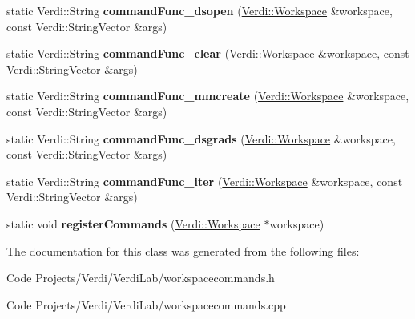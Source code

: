 \begin{DoxyCompactItemize}
\item 
\hypertarget{class_workspace_commands_a1a93570b748e9f36a4cf906cdf3c1391}{static \-Verdi\-::\-String {\bfseries command\-Func\-\_\-dsopen} (\hyperlink{class_verdi_1_1_workspace}{\-Verdi\-::\-Workspace} \&workspace, const \-Verdi\-::\-String\-Vector \&args)}\label{class_workspace_commands_a1a93570b748e9f36a4cf906cdf3c1391}

\item 
\hypertarget{class_workspace_commands_a8002b4885deb74c77c5c588121a77990}{static \-Verdi\-::\-String {\bfseries command\-Func\-\_\-clear} (\hyperlink{class_verdi_1_1_workspace}{\-Verdi\-::\-Workspace} \&workspace, const \-Verdi\-::\-String\-Vector \&args)}\label{class_workspace_commands_a8002b4885deb74c77c5c588121a77990}

\item 
\hypertarget{class_workspace_commands_a567dd0a62c2c9a026ed2b07e68b0336b}{static \-Verdi\-::\-String {\bfseries command\-Func\-\_\-mmcreate} (\hyperlink{class_verdi_1_1_workspace}{\-Verdi\-::\-Workspace} \&workspace, const \-Verdi\-::\-String\-Vector \&args)}\label{class_workspace_commands_a567dd0a62c2c9a026ed2b07e68b0336b}

\item 
\hypertarget{class_workspace_commands_ac7d9c4395b9c04cba9ce8e05bbc612c2}{static \-Verdi\-::\-String {\bfseries command\-Func\-\_\-dsgrads} (\hyperlink{class_verdi_1_1_workspace}{\-Verdi\-::\-Workspace} \&workspace, const \-Verdi\-::\-String\-Vector \&args)}\label{class_workspace_commands_ac7d9c4395b9c04cba9ce8e05bbc612c2}

\item 
\hypertarget{class_workspace_commands_a00687b362e9c2e422e568630a1c135f5}{static \-Verdi\-::\-String {\bfseries command\-Func\-\_\-iter} (\hyperlink{class_verdi_1_1_workspace}{\-Verdi\-::\-Workspace} \&workspace, const \-Verdi\-::\-String\-Vector \&args)}\label{class_workspace_commands_a00687b362e9c2e422e568630a1c135f5}

\item 
\hypertarget{class_workspace_commands_a55551b38d8ab2901c92369f0b579d783}{static void {\bfseries register\-Commands} (\hyperlink{class_verdi_1_1_workspace}{\-Verdi\-::\-Workspace} $\ast$workspace)}\label{class_workspace_commands_a55551b38d8ab2901c92369f0b579d783}

\end{DoxyCompactItemize}


\-The documentation for this class was generated from the following files\-:\begin{DoxyCompactItemize}
\item 
\-Code Projects/\-Verdi/\-Verdi\-Lab/workspacecommands.\-h\item 
\-Code Projects/\-Verdi/\-Verdi\-Lab/workspacecommands.\-cpp\end{DoxyCompactItemize}
